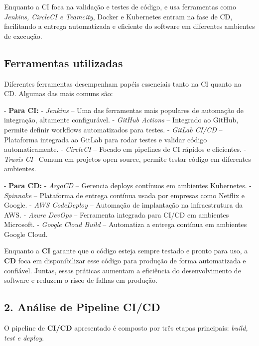 \documentclass[a4paper,12pt]{article}
\begin{document}
Enquanto a CI foca na validação e testes de código, e usa ferramentas como \textit{Jenkins, CircleCI e Teamcity}, Docker e Kubernetes entram na fase de CD, facilitando a entrega automatizada e eficiente do software em diferentes ambientes de execução.
\subsection*{Ferramentas utilizadas}
Diferentes ferramentas desempenham papéis essenciais tanto na CI quanto na CD. Algumas das mais comuns são:  

- \textbf{Para CI:} \newline{} 
- \textit{Jenkins} – Uma das ferramentas mais populares de automação de integração, altamente configurável.  \newline{}
  -  \textit{GitHub Actions} – Integrado ao GitHub, permite definir workflows automatizados para testes.  \newline{}
  -  \textit{GitLab CI/CD} – Plataforma integrada ao GitLab para rodar testes e validar código automaticamente.  \newline{}
  -  \textit{CircleCI} – Focado em pipelines de CI rápidos e eficientes.  \newline{}
  -  \textit{Travis CI}– Comum em projetos open source, permite testar código em diferentes ambientes.  \newline{}

  - \textbf{Para CD:} \newline
- \textit{ArgoCD} – Gerencia deploys contínuos em ambientes Kubernetes. \newline 
- \textit{Spinnake} – Plataforma de entrega contínua usada por empresas como Netflix e Google. \newline
- \textit{AWS CodeDeploy} – Automação de implantação na infraestrutura da AWS. \newline
- \textit{Azure DevOps} – Ferramenta integrada para CI/CD em ambientes Microsoft. \newline
- \textit{Google Cloud Build} – Automatiza a entrega contínua em ambientes Google Cloud. \newline

Enquanto a \textbf{CI} garante que o código esteja sempre testado e pronto para uso, a \textbf{CD} foca em disponibilizar esse código para produção de forma automatizada e confiável. Juntas, essas práticas aumentam a eficiência do desenvolvimento de software e reduzem o risco de falhas em produção.  

\subsection*{2. Análise de Pipeline CI/CD}  
O pipeline de \textbf{CI/CD} apresentado é composto por três etapas principais: \textit{build, test e deploy}.  
\end{document}
